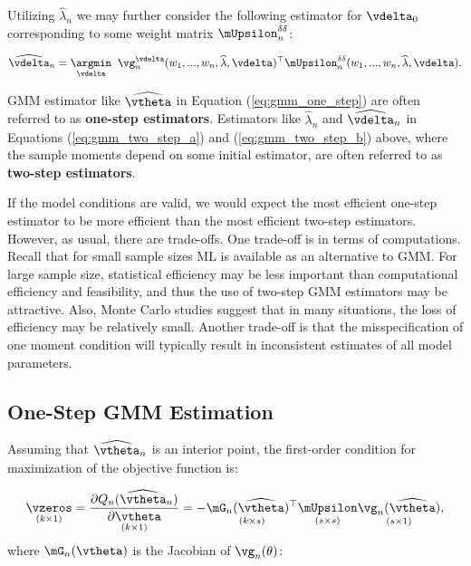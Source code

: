 \documentclass[english,12pt]{book}\usepackage[]{graphicx}\usepackage[]{xcolor}
\begin{document}
Utilizing $\widehat{\lambda}_n$ we may further consider the following estimator for $\vdelta_0$ corresponding to some weight matrix $\mUpsilon^{\delta\delta}_n$:

\begin{equation}\label{eq:gmm_two_step_b}
\widehat{\vdelta}_n = \underset{\vdelta}{\argmin}\;\;\vg_n^{\vdelta}(w_1,...,w_n, \widehat{\lambda}, \vdelta)^\top\mUpsilon^{\delta\delta}_n(w_1,...,w_n, \widehat{\lambda}, \vdelta).
\end{equation}

GMM estimator like $\widehat{\vtheta}$ in Equation (\ref{eq:gmm_one_step}) are often referred to as \textbf{one-step estimators}. Estimators like $\widehat{\lambda}_n$ and $\widehat{\vdelta}_n$ in Equations (\ref{eq:gmm_two_step_a}) and (\ref{eq:gmm_two_step_b}) above, where the sample moments depend on some initial estimator, are often referred to as \textbf{two-step estimators}.

If the model conditions are valid, we would expect the most efficient one-step estimator to be more efficient than the most efficient two-step estimators. However, as usual, there are trade-offs. One trade-off is in terms of computations. Recall that for small sample sizes ML is available as an alternative to GMM. For large sample size, statistical efficiency may be less important than computational efficiency and feasibility, and thus the use of two-step GMM estimators may be attractive. Also, Monte Carlo studies suggest that in many situations, the loss of efficiency may be relatively small. Another trade-off is that the misspecification of one moment condition will typically result in inconsistent estimates of all model parameters. 

\subsection{One-Step GMM Estimation}

Assuming that $\widehat{\vtheta}_n$ is an interior point, the first-order condition for maximization of the objective function is:

\begin{equation}\label{eq:foc_review}
  \underset{(k\times 1)}{\vzeros} = \underset{(k\times 1)}{\frac{\partial Q_n(\widehat{\vtheta}_n)}{\partial \vtheta}} = - \underset{(k\times s)}{\mG_n(\widehat{\vtheta})^\top}\underset{(s\times s)}{\mUpsilon}\underset{(s\times 1)}{\vg_n(\widehat{\vtheta})},
\end{equation}
%
where $\mG_n(\vtheta)$ is the Jacobian of $\vg_n(\theta)$:
\end{document}
